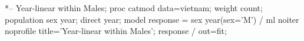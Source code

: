 \begin{listing}
*-- Year-linear within Males;
proc catmod data=vietnam;
   weight count;
   population sex year;
   direct year;
   model response = sex year(sex='M')
       / ml noiter noprofile title='Year-linear within Males';
   response / out=fit;
\end{listing}
